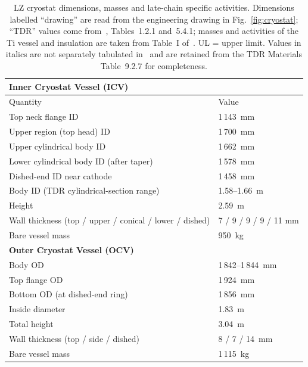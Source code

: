 \documentclass[11pt,a4paper]{article}
\begin{document}
\begin{table}[h]
  \centering
  \footnotesize
  \caption{LZ cryostat dimensions, masses and late-chain
  specific activities. Dimensions labelled ``drawing'' are read from
  the engineering drawing in Fig.~\ref{fig:cryostat}; ``TDR'' values
  come from~\cite{LZ-TDR}, Tables~1.2.1 and~5.4.1; masses and
  activities of the Ti vessel and insulation are taken from
  Table~I of~\cite{LZ-bbonu}. UL = upper limit. Values in italics
  are not separately tabulated in~\cite{LZ-bbonu} and are retained
  from the TDR Materials Table~9.2.7 for completeness.}
  \label{tab:cryostat}
  \begin{tabular}{ll}
    \toprule
    \multicolumn{2}{l}{\textbf{Inner Cryostat Vessel (ICV)}} \\
    \midrule
    Quantity                                    & Value \\
    \midrule
    Top neck flange ID                          & 1\,143~mm \\
    Upper region (top head) ID                  & 1\,700~mm \\
    Upper cylindrical body ID                   & 1\,662~mm \\
    Lower cylindrical body ID (after taper)     & 1\,578~mm \\
    Dished-end ID near cathode                  & 1\,458~mm \\
    Body ID (TDR cylindrical-section range)     & 1.58--1.66~m \\
    Height                                      & 2.59~m \\
    Wall thickness (top / upper / conical / lower / dished) & 7 / 9 / 9 / 9 / 11 mm \\
    Bare vessel mass                            & 950~kg \\
    \midrule
    \multicolumn{2}{l}{\textbf{Outer Cryostat Vessel (OCV)}} \\
    \midrule
    Body OD                                     & 1\,842--1\,844~mm \\
    Top flange OD                               & 1\,924~mm \\
    Bottom OD (at dished-end ring)              & 1\,856~mm \\
    Inside diameter                             & 1.83~m \\
    Total height                                & 3.04~m \\
    Wall thickness (top / side / dished)        & 8 / 7 / 14~mm \\
    Bare vessel mass                            & 1\,115~kg \\
    \bottomrule
  \end{tabular}


\end{table}
\end{document}
